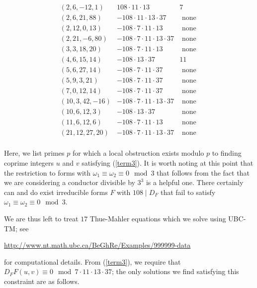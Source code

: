 $$\begin{array}{ccc}
 (2, 6, -12, 1) & 108 \cdot 11 \cdot 13 & 7\\
(2,6,21,88) & -108 \cdot 11 \cdot 13 \cdot 37 &  \mbox{ none } \\
(2,12,0,13) & -108 \cdot 7 \cdot 11 \cdot 13 &  \mbox{ none }\\
(2,21,-6,80) &  -108 \cdot 7 \cdot 11 \cdot 13 \cdot 37 &  \mbox{ none } \\
(3,3,18,20) &  -108 \cdot 7 \cdot 11 \cdot 13 &  \mbox{ none } \\
(4,6,15,14) & -108 \cdot 13 \cdot  37 & 11 \\
(5,6,27,14) & -108 \cdot 7 \cdot 11 \cdot 37 &  \mbox{ none } \\
 (5,9,3,21) & -108 \cdot 7 \cdot 11 \cdot 37 &  \mbox{ none } \\
(7,0,12,14) &  -108 \cdot 7 \cdot 11 \cdot 37 &  \mbox{ none } \\
(10,3,42,-16) & -108 \cdot 7 \cdot 11 \cdot 13 \cdot 37 &  \mbox{ none }\\
(10,6,12,3) & -108 \cdot 13 \cdot  37 &  \mbox{ none }\\
 (11,6,12,6) & -108 \cdot 7 \cdot 11 \cdot 13  &  \mbox{ none }\\
(21,12,27,20) &  -108 \cdot 7 \cdot 11 \cdot 13 \cdot 37 &  \mbox{ none }  \\
\end{array}
$$

Here, we list primes $p$ for which a local obstruction exists modulo $p$ to finding coprime integers  $u$ and $v$ satisfying (\ref{term3}). 
It is worth noting at this point that the restriction to forms with $\omega_1 \equiv \omega_2 \equiv 0 \mod{3}$ that follows from the fact that we are considering a conductor divisible by $3^3$ is a helpful one. There certainly can and do exist irreducible forms $F$ with $108 \mid D_F$ that fail to satisfy $\omega_1 \equiv \omega_2 \equiv 0 \mod{3}$.

We are thus left to treat $17$ Thue-Mahler equations which we solve using UBC-TM; see 
\begin{center}
\url{http://www.nt.math.ubc.ca/BeGhRe/Examples/999999-data}
\end{center}
 for computational details. From (\ref{term3}), we require that
$D_F F(u,v) \equiv 0 \mod{7 \cdot 11 \cdot 13 \cdot 37}$; the only solutions we find satisfying this constraint are as follows.

